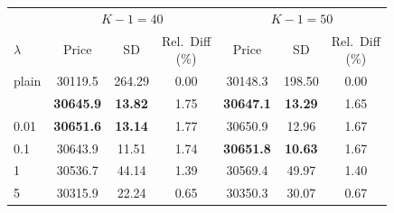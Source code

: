 \begin{table}
\begin{tabular}[t]{lcccccc}
\multicolumn{1}{c}{ } & \multicolumn{3}{c}{$K-1 = 40$} & \multicolumn{3}{c}{$K-1 = 50$} \\
\cmidrule(l{3pt}r{3pt}){2-4} \cmidrule(l{3pt}r{3pt}){5-7}
$\lambda$ & Price & SD & \shortstack{Rel.\ Diff\\(\%)} & Price & SD & \shortstack{Rel.\ Diff\\(\%)}\\
\midrule
plain & 30119.5 & 264.29 & 0.00 & 30148.3 & 198.50 & 0.00\\
\addlinespace
0.001 & \textbf{30645.9} & \textbf{13.82} & 1.75 & \textbf{30647.1} & \textbf{13.29} & 1.65\\
0.01 & \textbf{30651.6} & \textbf{13.14} & 1.77 & 30650.9 & 12.96 & 1.67\\
0.1 & 30643.9 & 11.51 & 1.74 & \textbf{30651.8} & \textbf{10.63} & 1.67\\
1 & 30536.7 & 44.14 & 1.39 & 30569.4 & 49.97 & 1.40\\
5 & 30315.9 & 22.24 & 0.65 & 30350.3 & 30.07 & 0.67\\
\bottomrule
\end{tabular}
\end{table}

